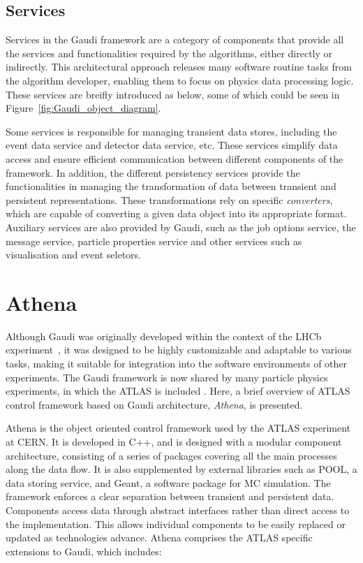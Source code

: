 \subsection{Services}
Services in the Gaudi framework are a category of components that provide all the services and functionalities required by the algorithms, either directly or indirectly. This architectural approach releases many software routine tasks from the algorithm developer, enabling them to focus on physics data processing logic. These services are breifly introduced as below, some of which could be seen in Figure~\ref{fig:Gaudi_object_diagram}.

Some services is responsible for managing transient data stores, including the event data service and detector data service, etc. These services simplify data access and ensure efficient communication between different components of the framework. In addition, the different persistency services provide the functionalities in managing the transformation of data between transient and persistent representations. These transformations rely on specific \textit{converters}, which are capable of converting a given data object into its appropriate format. Auxiliary services are also provided by Gaudi, such as the job options service, the message service, particle properties service and other services such as visualisation and event seletors.

\section{Athena}
Although Gaudi was originally developed within the context of the LHCb experiment~\cite{LHCb_tech}, it was designed to be highly customizable and adaptable to various tasks, making it suitable for integration into the software environments of other experiments. The Gaudi framework is now shared by many particle physics experiments, in which the ATLAS is included \cite{CHEP2004}. Here, a brief overview of ATLAS control framework based on Gaudi architecture, \textit{Athena}, is presented.

Athena is the object oriented control framework used by the ATLAS experiment at CERN. It is developed in C++, and is designed with a modular component architecture, consisting of a series of packages covering all the main processes along the data flow. It is also supplemented by external libraries such as POOL, a data storing service, and Geant, a software package for MC simulation.
The framework enforces a clear separation between transient and persistent data. Components access data through abstract interfaces rather than direct access to the implementation. This allows individual components to be easily replaced or updated as technologies advance. Athena comprises the ATLAS specific extensions to Gaudi, which includes:

